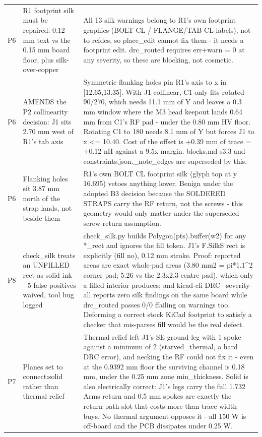 \documentclass[11pt,a4paper]{article}
\begin{document}
{\begin{longtable}{lp{5.2cm}p{7.2cm}}
P6 & R1 footprint silk must be repaired: 0.12 mm text vs the 0.15 mm board floor, plus silk-over-copper & All 13 silk warnings belong to R1's own footprint graphics (BOLT CL / FLANGE/TAB CL labels), not to refdes, so place\_edit cannot fix them - it needs a footprint edit. drc\_routed requires err+warn = 0 at any severity, so these are blocking, not cosmetic. \\
P6 & AMENDS the P2 collinearity decision: J1 sits 2.70 mm west of R1's tab axis & Symmetric flanking holes pin R1's axis to x in {[}12.65,13.35{]}. With J1 collinear, C1 only fits rotated 90/270, which needs 11.1 mm of Y and leaves a 0.3 mm window where the M3 head keepout lands 0.64 mm from C1's RF pad - under the 0.80 mm HV floor. Rotating C1 to 180 needs 8.1 mm of Y but forces J1 to x \textless{}= 10.40. Cost of the offset is +0.39 mm of trace = +0.12 nH against a 9.5x margin. blocks.md s3.3 and constraints.json.\_note\_edges are superseded by this. \\
P6 & Flanking holes sit 3.87 mm north of the strap lands, not beside them & R1's own BOLT CL footprint silk (glyph top at y 16.695) vetoes anything lower. Benign under the adopted B3 decision because the SOLDERED STRAPS carry the RF return, not the screws - this geometry would only matter under the superseded screw-return assumption. \\
P8 & check\_silk treats an UNFILLED rect as solid ink - 5 false positives waived, tool bug logged & check\_silk.py builds Polygon(pts).buffer(w2) for any {*}\_rect and ignores the fill token. J1's F.SilkS rect is explicitly (fill no), 0.12 mm stroke. Proof: reported areas are exact whole-pad areas (3.80 mm2 = pi{*}1.1\textasciicircum{}2 corner pad; 5.26 vs the 2.3x2.3 centre pad), which only a filled interior produces; and kicad-cli DRC --severity-all reports zero silk findings on the same board while drc\_routed passes 0/0 ffailing on warnings too. Deforming a correct stock KiCad footprint to satisfy a checker that mis-parses fill would be the real defect. \\
P7 & Planes set to connect:solid rather than thermal relief & Thermal relief left J1's SE ground leg with 1 spoke against a minimum of 2 (starved\_thermal, a hard DRC error), and necking the RF could not fix it - even at the 0.9392 mm floor the surviving channel is 0.18 mm, under the 0.25 mm zone min\_thickness. Solid is also electrically correct: J1's legs carry the full 1.732 Arms return and 0.5 mm spokes are exactly the return-path slot that costs more than trace width buys. No thermal argument opposes it - all 150 W is off-board and the PCB dissipates under 0.25 W. \\

\end{longtable}}
\end{document}
